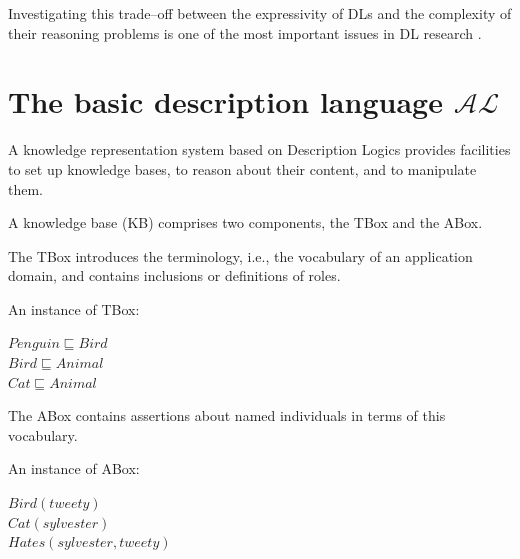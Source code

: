 \documentclass[a4paper, 11pt, oneside]{duthesis}
\newcommand{\al}{\mathcal{AL}}
\begin{document}
Investigating this trade--off between the expressivity of DLs and the complexity of their reasoning problems is one of the most important issues in DL research
\cite{Baader:2003:BDL:885746.885749}.


\newpage


%
%

\section{The basic description language $\al$}
A knowledge representation system based on Description Logics provides facilities to set up knowledge bases, to reason about their content, and to manipulate them.

A knowledge base (KB) comprises two components, the TBox and the ABox.

The TBox introduces the terminology, i.e., the vocabulary of an application domain, and contains inclusions or definitions of roles. 

An instance of TBox:
\begin{center}
$Penguin \sqsubseteq Bird$\\
$Bird \sqsubseteq Animal$\\
$Cat \sqsubseteq Animal$
\end{center}


The ABox contains assertions about named individuals in terms of this vocabulary.

An instance of ABox:
\begin{center}
$Bird(tweety)$\\
$Cat(sylvester)$\\
$Hates(sylvester, tweety)$
\end{center}
\end{document}
